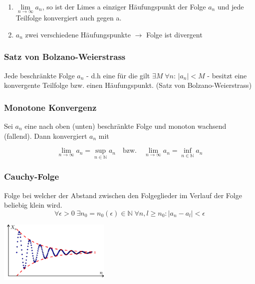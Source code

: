 \documentclass[6pt]{article}
\begin{document}
\begin{multicols*}{3}
\begin{enumerate}[label=(\roman*), itemsep=2pt, parsep=2pt]
		\item $\lim\limits_{n \to \infty}  a_n$, so ist der Limes a einziger H{\"a}ufungspunkt der Folge $a_n$ und jede Teilfolge konvergiert auch gegen a. 
		\item $a_n$ zwei verschiedene H{\"a}ufungspunkte $\rightarrow$ Folge ist divergent
\end{enumerate}



\subsubsection*{Satz von Bolzano-Weierstrass}
Jede beschr{\"a}nkte Folge $a_n$ - d.h eine f{\"u}r die gilt $\exists M \; \forall n:\, |a_n|<M$ - besitzt eine 
		konvergente Teilfolge bzw. einen H{\"a}ufungspunkt. (Satz von Bolzano-Weierstrass) 
		
\subsubsection*{Monotone Konvergenz}
				Sei $a_n$ eine nach oben (unten) beschr{\"a}nkte Folge und monoton wachsend (fallend). 	Dann konvergiert $a_n$ mit 
					
					\begin{equation*}
  							\lim_{n \to \infty} a_n = \sup_{n \in \mathbb{N}} a_n \quad \text{bzw.} \quad  \lim_{n \to \infty} a_n = \inf_{n \in\mathbb{N}} a_n
					\end{equation*}


\columnbreak

\subsubsection*{Cauchy-Folge}
Folge bei welcher der Abstand zwischen den Folgeglieder im Verlauf der Folge beliebig klein wird. 
\vspace{0mm}\\
\begin{equation*}
	\forall \epsilon>0 \; \exists n_0 = n_0(\epsilon) \in \mathbb{N} \; \forall n,l \geq n_0: | a_n - a_l | < \epsilon	
\end{equation*}

\begin{center}
	 \par
	\vspace{5mm}
	\includegraphics[width=150pt]{images/cauchy_folge}
\end{center}




\end{multicols*}
\end{document}
